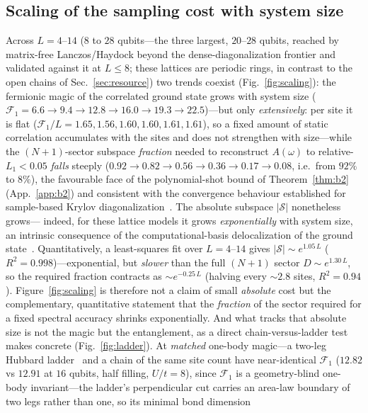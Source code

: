\subsection{Scaling of the sampling cost with system size}
Across $L=4$--$14$ ($8$ to $28$ qubits---the three largest, $20$--$28$ qubits, reached by matrix-free
Lanczos/Haydock beyond the dense-diagonalization frontier and validated against it at $L\le8$; these
lattices are periodic rings, in contrast to the open chains of Sec.~\ref{sec:resource}) two
trends coexist (Fig.~\ref{fig:scaling}): the fermionic magic of the correlated ground state grows with
system size ($\mathcal F_1=6.6\to9.4\to12.8\to16.0\to19.3\to22.5$)---but only \emph{extensively}: per site
it is flat ($\mathcal F_1/L=1.65,1.56,1.60,1.60,1.61,1.61$), so a fixed amount of static correlation
accumulates with the sites and does not strengthen with size---while
the $(N{+}1)$-sector subspace \emph{fraction} needed to reconstruct $A(\omega)$ to relative-$L_1<0.05$
\emph{falls} steeply ($0.92\to0.82\to0.56\to0.36\to0.17\to0.08$, i.e.\ from $92\%$ to $8\%$), the favourable
face of the polynomial-shot bound of Theorem~\ref{thm:b2} (App.~\ref{app:b2}) and consistent with the
convergence behaviour established for sample-based Krylov
diagonalization~\cite{skqd2025,yoshioka2025}. The absolute subspace $|\mathcal S|$ nonetheless grows---
indeed, for these lattice models it grows \emph{exponentially} with system size, an intrinsic
consequence of the computational-basis delocalization of the ground state~\cite{gaberle2026}. Quantitatively,
a least-squares fit over $L=4$--$14$ gives $|\mathcal S|\sim e^{1.05\,L}$ ($R^2=0.998$)---exponential, but
\emph{slower} than the full $(N{+}1)$ sector $D\sim e^{1.30\,L}$, so the required fraction contracts as
$\sim e^{-0.25\,L}$ (halving every $\sim2.8$ sites, $R^2=0.94$). Figure~\ref{fig:scaling}
is therefore not a claim of small \emph{absolute} cost but the complementary, quantitative statement that the
\emph{fraction} of the sector required for a fixed spectral accuracy shrinks exponentially. And what tracks that
absolute size is not the magic but the entanglement, as a direct chain-versus-ladder test makes concrete
(Fig.~\ref{fig:ladder}). At \emph{matched} one-body magic---a two-leg Hubbard ladder~\cite{nogaki2025} and
a chain of the same site count have near-identical $\mathcal F_1$ ($12.82$ vs $12.91$ at $16$ qubits, half
filling, $U/t=8$), since $\mathcal F_1$ is a geometry-blind one-body invariant---the ladder's
perpendicular cut carries an area-law boundary of two legs rather than one, so its minimal bond dimension
